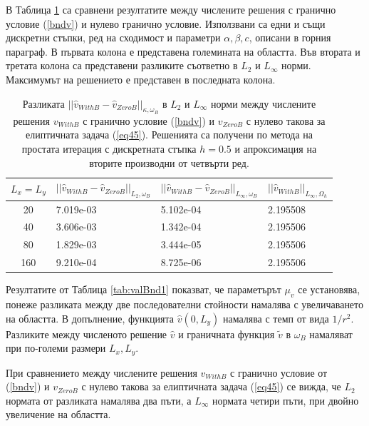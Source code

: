 \documentclass[a4paper]{article}
\newcommand{\rf}[1]{(\ref{#1})}
\theoremstyle{remark}
\begin{document}
\begin{large}
В Таблица \ref{tableBnd} са сравнени резултатите между числените решения с гранично условие \rf{bndv} и нулево гранично условие. Използвани са едни и същи дискретни стъпки, ред на сходимост и параметри $\alpha, \beta, c$, описани в горния параграф. В първата колона е представена големината на областта. Във втората и третата колона са представени разликите съответно в $L_2$ и $L_\infty$ норми. Максимумът на решението е представен в последната колона.
\begin{table}[ht]
\centering
\small
		\begin{tabular}{||c|l|l|l||}
			\hline
			\hline
      $ L_{ x} = L_{ y}$        &  $|| \widehat v_{WithB} - \widehat v_{ZeroB} ||_{L_2,\omega_B}$  & $|| \widehat v_{WithB} - \widehat v_{ZeroB} ||_{L_\infty,\omega_B}$     &   $|| \widehat v_{WithB} ||_{L_\infty,\Omega_h}$ \\
   			\hline
			\hline
      20    & 7.019e-03   &  5.102e-04    	&     2.195508  \\
               	 \hline
    40      & 3.606e-03   &   1.342e-04    &    2.195506 \\
			\hline 	
      80    & 1.829e-03  &      3.444e-05  &  2.195506 \\
			\hline 	
     160     & 9.210e-04  &    8.725e-06 	& 2.195506 \\
	   \hline
		\hline 
		\end{tabular}
		\caption{Разликата $||\widehat v_{WithB} - \widehat v_{ZeroB}||_{\kappa,\omega_B}$ в $L_2$ и $L_\infty$ норми между числените решения $v_{WithB}$ с гранично условие \rf{bndv} и $v_{ZeroB}$ с нулево такова за елиптичната задача \rf{eq45}. Решенията са получени по метода на простата итерация с дискретната стъпка $h=0.5$ и апроксимация на вторите производни от четвърти ред. }
\label{tableBnd}
\end{table}
\FloatBarrier

Резултатите от Таблица \ref{tab:valBnd1} показват, че параметърът $\mu_v$ се установява, понеже разликата между две последователни стойности намалява с увеличаването на областта. В допълнение, функцията $\widehat v(0,L_y)$ намалява с темп от вида $1/r^2$. Разликите между численото решение $\widehat v$ и граничната функция $\tilde v$ в $\omega_B$ намаляват при по-големи размери $L_x, L_y$. 

При сравнението между числените решения $v_{WithB}$ с гранично условие от \rf{bndv} и $v_{ZeroB}$ с нулево такова за елиптичната задача \rf{eq45} се вижда, че $L_2$ нормата от разликата намалява два пъти, а $L_\infty$ нормата четири пъти, при двойно увеличение на областта. 


\end{large}
\end{document}
